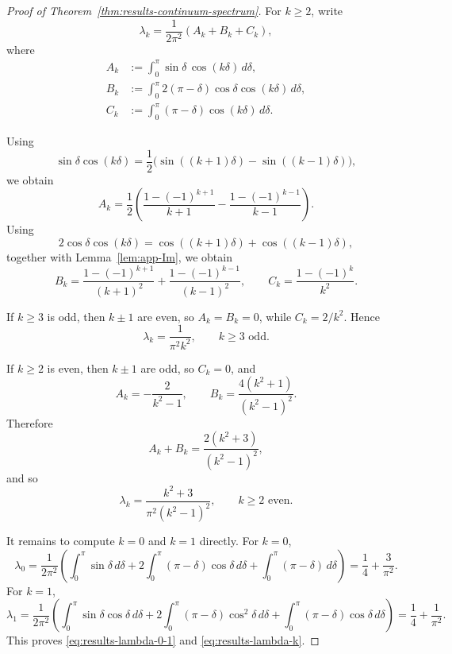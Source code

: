 \begin{proof}[Proof of Theorem~\ref{thm:results-continuum-spectrum}]
	For \(k\ge 2\), write
	\[
		\lambda_k=\frac{1}{2\pi^2}(A_k+B_k+C_k),
	\]
	where
	\begin{align*}
		A_k & :=\int_0^\pi \sin\delta\,\cos(k\delta)\,d\delta,            \\
		B_k & :=\int_0^\pi 2(\pi-\delta)\cos\delta\cos(k\delta)\,d\delta, \\
		C_k & :=\int_0^\pi (\pi-\delta)\cos(k\delta)\,d\delta.
	\end{align*}

	Using
	\[
		\sin\delta\cos(k\delta)
		=
		\frac12\bigl(\sin((k+1)\delta)-\sin((k-1)\delta)\bigr),
	\]
	we obtain
	\[
		A_k
		=
		\frac12\left(
		\frac{1-(-1)^{k+1}}{k+1}
		-
		\frac{1-(-1)^{k-1}}{k-1}
		\right).
	\]
	Using
	\[
		2\cos\delta\cos(k\delta)=\cos((k+1)\delta)+\cos((k-1)\delta),
	\]
	together with Lemma~\ref{lem:app-Im}, we obtain
	\[
		B_k
		=
		\frac{1-(-1)^{k+1}}{(k+1)^2}
		+
		\frac{1-(-1)^{k-1}}{(k-1)^2},
		\qquad
		C_k
		=
		\frac{1-(-1)^k}{k^2}.
	\]

	If \(k\ge 3\) is odd, then \(k\pm1\) are even, so \(A_k=B_k=0\), while
	\(C_k=2/k^2\). Hence
	\begin{equation}
		\lambda_k=\frac{1}{\pi^2 k^2},
		\qquad
		k\ge 3 \text{ odd}.
		\label{eq:app-lambda-odd}
	\end{equation}

	If \(k\ge 2\) is even, then \(k\pm1\) are odd, so \(C_k=0\), and
	\[
		A_k
		=
		-\frac{2}{k^2-1},
		\qquad
		B_k
		=
		\frac{4(k^2+1)}{(k^2-1)^2}.
	\]
	Therefore
	\[
		A_k+B_k
		=
		\frac{2(k^2+3)}{(k^2-1)^2},
	\]
	and so
	\begin{equation}
		\lambda_k
		=
		\frac{k^2+3}{\pi^2 (k^2-1)^2},
		\qquad
		k\ge 2 \text{ even}.
		\label{eq:app-lambda-even}
	\end{equation}

	It remains to compute \(k=0\) and \(k=1\) directly. For \(k=0\),
	\[
		\lambda_0
		=
		\frac{1}{2\pi^2}
		\left(
		\int_0^\pi \sin\delta\,d\delta
		+
		2\int_0^\pi (\pi-\delta)\cos\delta\,d\delta
		+
		\int_0^\pi (\pi-\delta)\,d\delta
		\right)
		=
		\frac14+\frac{3}{\pi^2}.
	\]
	For \(k=1\),
	\[
		\lambda_1
		=
		\frac{1}{2\pi^2}
		\left(
		\int_0^\pi \sin\delta\cos\delta\,d\delta
		+
		2\int_0^\pi (\pi-\delta)\cos^2\delta\,d\delta
		+
		\int_0^\pi (\pi-\delta)\cos\delta\,d\delta
		\right)
		=
		\frac14+\frac{1}{\pi^2}.
	\]
	This proves \eqref{eq:results-lambda-0-1} and \eqref{eq:results-lambda-k}.
\end{proof}


